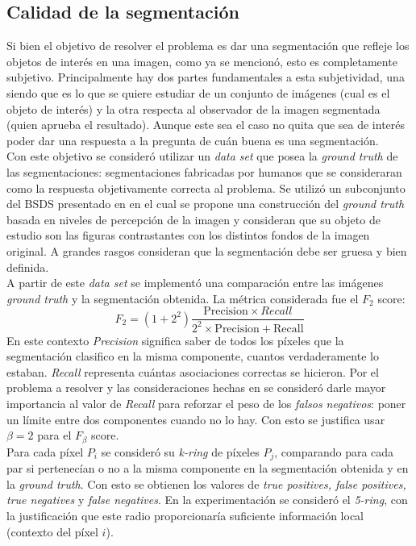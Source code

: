 \subsection{Calidad de la segmentaci\'on}
Si bien el objetivo de resolver el problema es dar una segmentaci\'on que refleje los objetos de interés en una imagen, como ya se mencion\'o, esto es completamente subjetivo. Principalmente hay dos partes fundamentales a esta subjetividad, una siendo que es lo que se quiere estudiar de un conjunto de imágenes (cual es el objeto de interés) y la otra respecta al observador de la imagen segmentada (quien aprueba el resultado). Aunque este sea el caso no quita que sea de interés poder dar una respuesta a la pregunta de cu\'an buena es una segmentaci\'on. \\
\indent Con este objetivo se consider\'o utilizar un \textit{data set} que posea la \textit{ground truth} de las segmentaciones: segmentaciones fabricadas por humanos que se consideraran como la respuesta objetivamente correcta al problema. Se utiliz\'o un subconjunto del BSDS presentado en \cite{li2013benchmark} en el cual se propone una construcci\'on del \textit{ground truth} basada en niveles de percepción de la imagen y consideran que su objeto de estudio son las figuras contrastantes con los distintos fondos de la imagen original. A grandes rasgos consideran que la segmentaci\'on debe ser gruesa y bien definida. \\
\indent A partir de este \textit{data set} se implement\'o una comparaci\'on entre las imágenes \textit{ground truth} y la segmentaci\'on obtenida. La m\'etrica considerada fue el $F_2$ score:
\[
	F_2 = (1+2^2)\frac{\text{Precision}\times{Recall}}{2^2\times \text{Precision}+\text{Recall}}
\]
\indent En este contexto \textit{Precision} significa saber de todos los píxeles que la segmentaci\'on clasifico en la misma componente, cuantos verdaderamente lo estaban. \textit{Recall} representa cuántas asociaciones correctas se hicieron. Por el problema a resolver y las consideraciones hechas en \cite{Felzenszwalb2004} se consider\'o darle mayor importancia al valor de \textit{Recall} para reforzar el peso de los \textit{falsos negativos}: poner un l\'imite entre dos componentes cuando no lo hay. Con esto se justifica usar $\beta =2$ para el $F_{\beta}$ score.\\
\indent Para cada píxel $P_i$ se consider\'o su \textit{k-ring} de píxeles $P_j$, comparando para cada par si pertenecían o no a la misma componente en la segmentaci\'on obtenida y en la \textit{ground truth}. Con esto se obtienen los valores de \textit{true positives, false positives, true negatives} y \textit{false negatives}. En la experimentaci\'on se consider\'o el \textit{5-ring}, con la justificaci\'on que este radio proporcionar\'ia suficiente informaci\'on local (contexto del píxel $i$). \\
